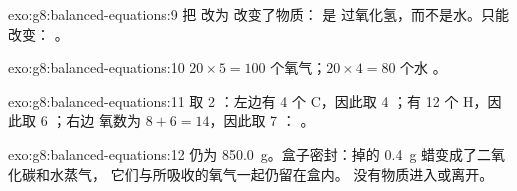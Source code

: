 \begin{solution}{exo:g8:balanced-equations:9}
把  改为  改变了物质： 是
过氧化氢，而不是水。只能改变：
。
\end{solution}

\begin{solution}{exo:g8:balanced-equations:10}
$20 \times 5 = 100$ 个氧气；$20 \times 4 = 80$ 个水
。
\end{solution}

\begin{solution}{exo:g8:balanced-equations:11}
取 2 ：左边有 4 个 C，因此取 4 ；有 12 个 H，因此取 6 ；右边
氧数为 $8 + 6 = 14$，因此取 7 ：
。
\end{solution}

\begin{solution}{exo:g8:balanced-equations:12}
仍为 \qty{850.0}{g}。盒子密封：掉的 \qty{0.4}{g} 蜡变成了二氧化碳和水蒸气，
它们与所吸收的氧气一起仍留在盒内。
没有物质进入或离开。
\end{solution}

